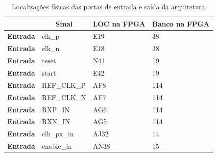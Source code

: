 \documentclass[11pt,a4paper]{article}
\begin{document}
	\begin{table}[h!]
		\centering
		\caption{Localizações físicas das portas de entrada e saída da arquitetura}
		\label{table:LOC_simples_planE}
		\begin{tabular}{rlll}
			\hline
			\multicolumn{1}{l}{}                  & \multicolumn{1}{c}{\textbf{Sinal}}     & \multicolumn{1}{c}{\textbf{LOC na FPGA}} & \multicolumn{1}{c}{\textbf{Banco na FPGA}} \\ \hline
			\multicolumn{1}{r|}{\textbf{Entrada}} & clk\_p                                 & E19                                      & 38                                         \\
			\multicolumn{1}{r|}{\textbf{Entrada}} & clk\_n                                 & E18                                      & 38                                         \\
			\multicolumn{1}{r|}{\textbf{Entrada}} & reset                                  & N41                                      & 19                                         \\
			\multicolumn{1}{r|}{\textbf{Entrada}} & start                                  & E42                                      & 19                                         \\
			\multicolumn{1}{r|}{\textbf{Entrada}} & REF\_CLK\_P                            & AF8                                      & 114                                        \\
			\multicolumn{1}{r|}{\textbf{Entrada}} & REF\_CLK\_N                            & AF7                                      & 114                                        \\
			\multicolumn{1}{r|}{\textbf{Entrada}} & RXP\_IN                                & AG6                                      & 114                                        \\
			\multicolumn{1}{r|}{\textbf{Entrada}} & RXN\_IN                                & AG5                                      & 114                                        \\
			\multicolumn{1}{r|}{\textbf{Entrada}} & clk\_px\_in                            & AJ32                                     & 14                                         \\
			\multicolumn{1}{r|}{\textbf{Entrada}} & enable\_in                             & AN38                                     & 15                                         \\

\end{tabular}
\end{table}
\end{document}

